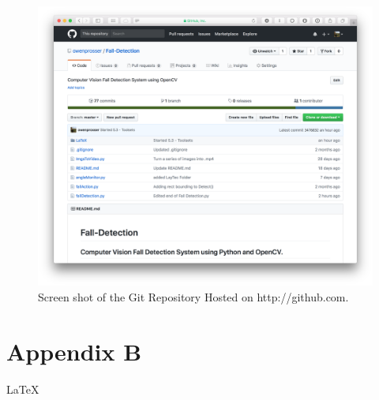 \documentclass[11pt,a4paper]{report}
\begin{document}
\begin{figure}[H]
 \centering
 \includegraphics[scale = 0.14]{GitRepo.png}
 \caption{Screen shot of the Git Repository Hosted on http://github.com.}
 \label{fig:GitRepo}
\end{figure}

\section{Appendix B}
\LaTeX
\end{document}
